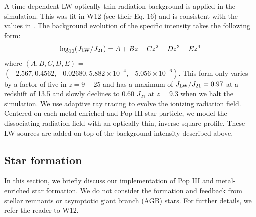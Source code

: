 \documentclass[fleqn,usenatbib]{mnras}
\begin{document}
A time-dependent LW optically thin radiation background is applied in the simulation. This was fit in W12 (see their Eq. 16) and is consistent with the values in \citet{Trenti09_SFR}. The background evolution of the specific intensity takes the following form:
\begin{equation} \label{LWbg}
	\log_{10}(J_{\rm LW}/J_{21}) = A + Bz - Cz^{2} + Dz^{3} - Ez^{4}
\end{equation}
where $(A, B, C, D, E)$ = $(-2.567, 0.4562, - 0.02680, 5.882 \times 10^{-4}, - 5.056 \times 10^{-6})$.  This form only varies by a factor of five in $z = 9-25$ and has a maximum of $J_{\rm LW}/J_{21} = 0.97$ at a redshift of 13.5 and slowly declines to 0.60 $J_{21}$ at $z = 9.3$ when we halt the simulation. We use adaptive ray tracing \citep{Abel02_RT, Wise11_Moray} to evolve the ionizing radiation field. Centered on each metal-enriched and Pop III star particle, we model the \hh{} dissociating radiation field with an optically thin, inverse square profile. These LW sources are added on top of the background intensity described above.
\subsection{Star formation}
In this section, we briefly discuss our implementation of Pop III and metal-enriched star formation. We do not consider the formation and feedback from stellar remnants or asymptotic giant branch (AGB) stars. For further details, we refer the reader to W12. 

\end{document}
